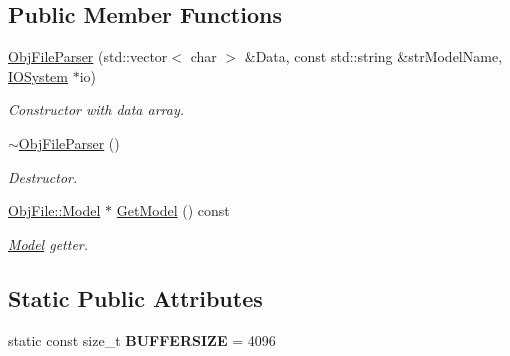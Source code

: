 \subsection*{Public Member Functions}
\begin{DoxyCompactItemize}
\item 
\hypertarget{class_assimp_1_1_obj_file_parser_a10e23ea6ef809aaf0c899252b68577e7}{\hyperlink{class_assimp_1_1_obj_file_parser_a10e23ea6ef809aaf0c899252b68577e7}{Obj\+File\+Parser} (std\+::vector$<$ char $>$ \&Data, const std\+::string \&str\+Model\+Name, \hyperlink{class_assimp_1_1_i_o_system}{I\+O\+System} $\ast$io)}\label{class_assimp_1_1_obj_file_parser_a10e23ea6ef809aaf0c899252b68577e7}

\begin{DoxyCompactList}\small\item\em Constructor with data array. \end{DoxyCompactList}\item 
\hypertarget{class_assimp_1_1_obj_file_parser_a2396485e9d23555a53e7967e38561c84}{\hyperlink{class_assimp_1_1_obj_file_parser_a2396485e9d23555a53e7967e38561c84}{$\sim$\+Obj\+File\+Parser} ()}\label{class_assimp_1_1_obj_file_parser_a2396485e9d23555a53e7967e38561c84}

\begin{DoxyCompactList}\small\item\em Destructor. \end{DoxyCompactList}\item 
\hypertarget{class_assimp_1_1_obj_file_parser_a449781f29b5a7024b498169054d59656}{\hyperlink{struct_assimp_1_1_obj_file_1_1_model}{Obj\+File\+::\+Model} $\ast$ \hyperlink{class_assimp_1_1_obj_file_parser_a449781f29b5a7024b498169054d59656}{Get\+Model} () const }\label{class_assimp_1_1_obj_file_parser_a449781f29b5a7024b498169054d59656}

\begin{DoxyCompactList}\small\item\em \hyperlink{class_model}{Model} getter. \end{DoxyCompactList}\end{DoxyCompactItemize}
\subsection*{Static Public Attributes}
\begin{DoxyCompactItemize}
\item 
\hypertarget{class_assimp_1_1_obj_file_parser_a0d6a791d27041b4f2bda75cfdc445c5e}{static const size\+\_\+t {\bfseries B\+U\+F\+F\+E\+R\+S\+I\+Z\+E} = 4096}\label{class_assimp_1_1_obj_file_parser_a0d6a791d27041b4f2bda75cfdc445c5e}

\end{DoxyCompactItemize}


